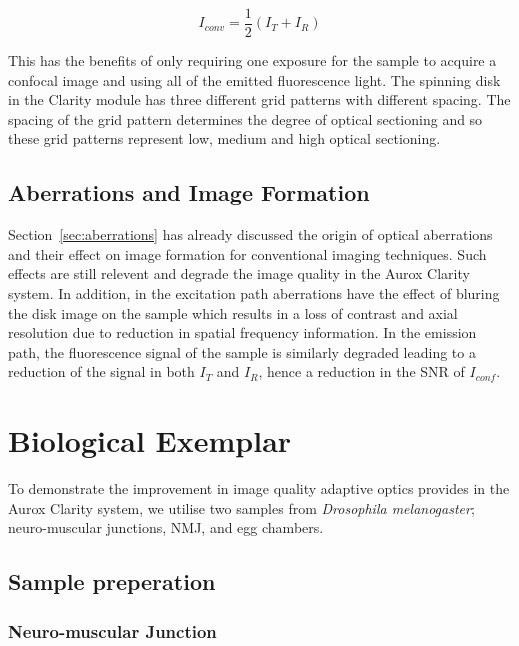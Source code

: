 \begin{equation}\label{eq:conventional_image}
I_{conv} = \frac{1}{2}\left(I_{T} + I_{R}\right)
\end{equation}

This has the benefits of only requiring one exposure for 
the sample to acquire a confocal image and using all of 
the emitted fluorescence light. The spinning disk in the 
Clarity module has three different grid patterns with 
different spacing. The spacing of the grid pattern determines
the degree of optical sectioning and so these grid patterns
represent low, medium and high optical sectioning.\cite{neil1997method}

\subsection{Aberrations and Image Formation}
\label{subsec:Aurox_aberrations}

Section~\ref{sec:aberrations} has already discussed the origin of 
optical aberrations and their effect on image formation for 
conventional imaging techniques. Such effects are still relevent
and degrade the image quality in the Aurox Clarity system. In addition,
in the excitation path aberrations have the effect of bluring the 
disk image on the sample which results in a loss of contrast and 
axial resolution due to reduction in spatial frequency
information.\cite{wilson1990confocal, hell1993aberrations} In the 
emission path, the fluorescence signal of the sample is similarly
degraded leading to a reduction of the signal in both $I_{T}$ and
$I_{R}$, hence a reduction in the SNR of $I_{conf}$. 

\section{Biological Exemplar}
\label{sec:Aurox_biology}

To demonstrate the improvement in image quality adaptive optics
provides in the Aurox Clarity system, we utilise two samples from
\textit{Drosophila melanogaster}; neuro-muscular junctions, NMJ, 
and egg chambers.

\subsection{Sample preperation}
\label{subsec:Aurox_sample_prep}

\subsubsection{Neuro-muscular Junction}
\label{subsubsec:Aurox_NMJ_prep}
	
